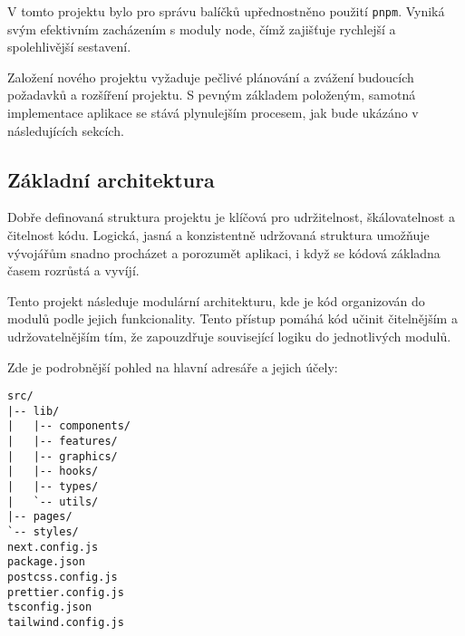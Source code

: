 V tomto projektu bylo pro správu balíčků upřednostněno použití \texttt{pnpm}.
Vyniká svým efektivním zacházením s moduly node, čímž zajišťuje rychlejší a spolehlivější sestavení.

Založení nového projektu vyžaduje pečlivé plánování a zvážení budoucích požadavků a rozšíření projektu.
S pevným základem položeným, samotná implementace aplikace se stává plynulejším procesem, jak bude ukázáno v následujících sekcích.

\subsection{Základní architektura}
\label{sec:implementace-architektura-zakladni}
Dobře definovaná struktura projektu je klíčová pro udržitelnost, škálovatelnost a čitelnost kódu.
Logická, jasná a konzistentně udržovaná struktura umožňuje vývojářům snadno procházet a porozumět aplikaci, i když se kódová základna časem rozrůstá a vyvíjí.

Tento projekt následuje modulární architekturu, kde je kód organizován do modulů podle jejich funkcionality.
Tento přístup pomáhá kód učinit čitelnějším a udržovatelnějším tím, že zapouzdřuje související logiku do jednotlivých modulů.

Zde je podrobnější pohled na hlavní adresáře a jejich účely:

\begin{lstlisting}[language={[LaTeX]TeX},caption={Struktura projektu},label={lst:project-structure}]
src/
|-- lib/
|   |-- components/
|   |-- features/
|   |-- graphics/
|   |-- hooks/
|   |-- types/
|   `-- utils/
|-- pages/
`-- styles/
next.config.js
package.json
postcss.config.js
prettier.config.js
tsconfig.json
tailwind.config.js
\end{lstlisting}

